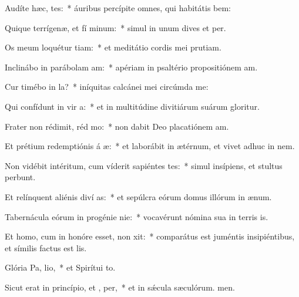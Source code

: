 \item Audíte hæc,  tes:~* áuribus percípite omnes, qui habitátis bem:
\item Quique terrígenæ, et fí minum:~* simul in unum dives et per.
\item Os meum loquétur tiam:~* et meditátio cordis mei prutiam.
\item Inclinábo in parábolam  am:~* apériam in psaltério propositiónem am.
\item Cur timébo in  la?~* iníquitas calcánei mei circúmda me:
\item Qui confídunt in vir a:~* et in multitúdine divitiárum suárum gloritur.
\item Frater non rédimit, réd mo:~* non dabit Deo placatiónem am.
\item Et prétium redemptiónis á æ:~* et laborábit in ætérnum, et vivet adhuc in nem.
\item Non vidébit intéritum, cum víderit sapiéntes tes:~* simul insípiens, et stultus perbunt.
\item Et relínquent aliénis diví as:~* et sepúlcra eórum domus illórum in ænum.
\item Tabernácula eórum in progénie  nie:~* vocavérunt nómina sua in terris is.
\item Et homo, cum in honóre esset, non xit:~* comparátus est juméntis insipiéntibus, et símilis factus est lis.
\item Glória Pa,  lio,~* et Spirítui to.
\item Sicut erat in princípio, et ,  per,~* et in sǽcula sæculórum. men.
